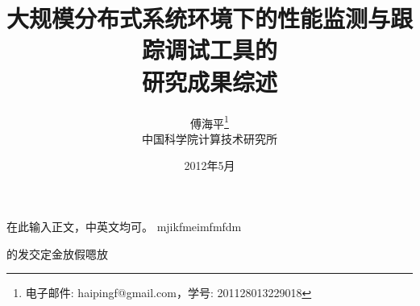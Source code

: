 \documentclass[a4paper,11pt]{article}
\begin{document}
\renewcommand{\contentsname}{目录}  %
\renewcommand{\abstractname}{摘要}  %
\renewcommand{\abstractname}{摘要}  %
\renewcommand{\refname}{参考文献}   %
\renewcommand{\indexname}{索引}
\renewcommand{\figurename}{图}
\renewcommand{\tablename}{表}
\renewcommand{\appendixname}{附录}













\title{大规模分布式系统环境下的性能监测与跟踪调试工具的\\研究成果综述}
\author{傅海平\footnote{电子邮件: haipingf@gmail.com，学号: 201128013229018}\\
中国科学院计算技术研究所
}
\date{2012年5月}


\maketitle

\tableofcontents


\newpage

在此输入正文，中英文均可。
mjikfmeimfmfdm

的发交定金放假嗯放
\end{document}
